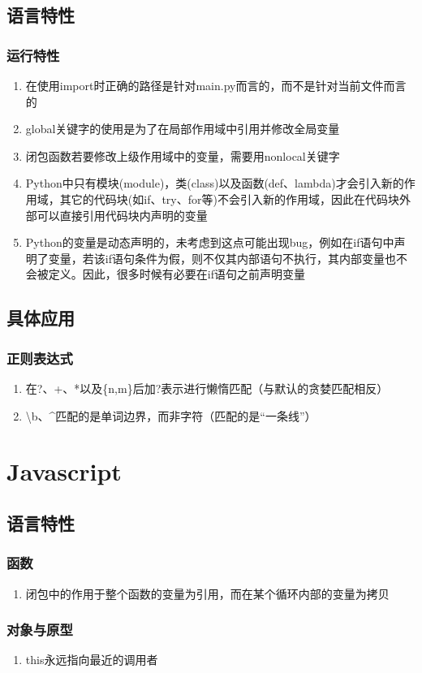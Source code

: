 \documentclass[onecolumn]{article}
\begin{document}
    \subsection{语言特性}
        \subsubsection{运行特性}
            \noindent
            \begin{enumerate}
                \item 在使用import时正确的路径是针对main.py而言的，而不是针对当前文件而言的
                \item global关键字的使用是为了在局部作用域中引用并修改全局变量
                \item 闭包函数若要修改上级作用域中的变量，需要用nonlocal关键字
                \item Python中只有模块(module)，类(class)以及函数(def、lambda)才会引入新的作用域，其它的代码块(如if、try、for等)不会引入新的作用域，因此在代码块外部可以直接引用代码块内声明的变量
                \item Python的变量是动态声明的，未考虑到这点可能出现bug，例如在if语句中声明了变量，若该if语句条件为假，则不仅其内部语句不执行，其内部变量也不会被定义。因此，很多时候有必要在if语句之前声明变量
            \end{enumerate}
    \subsection{具体应用}
        \subsubsection{正则表达式}
            \noindent
            \begin{enumerate}
                \item 在?、+、*以及\{n,m\}后加?表示进行懒惰匹配（与默认的贪婪匹配相反）
                \item \textbackslash b、\^{}匹配的是单词边界，而非字符（匹配的是“一条线”）
            \end{enumerate}
\newpage
\section{Javascript}
    \subsection{语言特性}
        \subsubsection{函数}
            \noindent
            \begin{enumerate}
                \item 闭包中的作用于整个函数的变量为引用，而在某个循环内部的变量为拷贝
            \end{enumerate}
        \subsubsection{对象与原型}
            \noindent
            \begin{enumerate}
                \item this永远指向最近的调用者
            \end{enumerate}        
\end{document}

